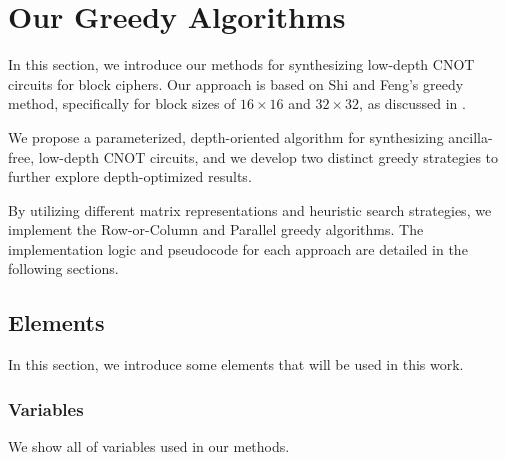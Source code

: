 \chapter{Our Greedy Algorithms}
\label{ch:our-algorithms}
In this section, we introduce our methods for synthesizing low-depth CNOT circuits for block ciphers. Our approach is based on Shi and Feng's greedy method, specifically for block sizes of $16 \times 16$ and $32 \times 32$, as discussed in \cite{cryptoeprint:2023/165}.

We propose a parameterized, depth-oriented algorithm for synthesizing ancilla-free, low-depth CNOT circuits, and we develop two distinct greedy strategies to further explore depth-optimized results.

By utilizing different matrix representations and heuristic search strategies, we implement the Row-or-Column and Parallel greedy algorithms. The implementation logic and pseudocode for each approach are detailed in the following sections.

\section{Elements}
In this section, we introduce some elements that will be used in this work.

\subsection{Variables}

We show all of variables used in our methods.

